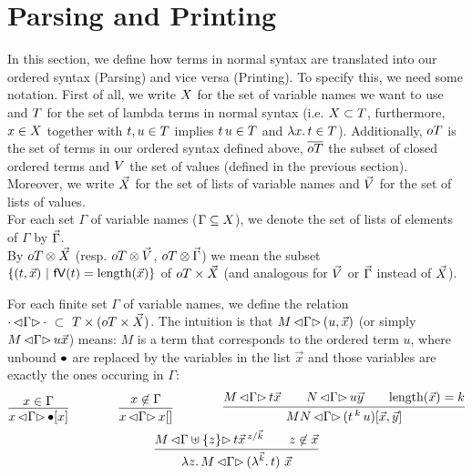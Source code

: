 \documentclass[submission,copyright,creativecommons]{eptcs}
\begin{document}
\section{Parsing and Printing}

In this section, we define how terms in normal syntax are translated into our ordered syntax (Parsing) and vice versa (Printing). 
To specify this, we need some notation. 
First of all, we write $X$ for the set of variable names we want to use and $T$ for the set of lambda terms in normal syntax (i.e. $X \subset T$, furthermore, $x \in X$ together with $t, u \in T$ implies $t \, u \in T$ and $\lambda {x}. \, t \in T$). Additionally, $oT$ is the set of terms in our ordered syntax defined above, $\overline{oT}$ the subset of closed ordered terms and $V$ the set of values (defined in the previous section).
Moreover, we write $\vec {X}$ for the set of lists of variable names and $\vec {V}$ for the set of lists of values. 
\\
For each set $\Gamma$ of variable names ($\Gamma \subseteq X$), we denote the set of lists of elements of $\Gamma$ by $\vec \Gamma$. 
\\
By $oT \otimes \vec {X}$ (resp. $oT \otimes \vec {V}$, $oT \otimes \vec \Gamma$) we mean the subset $\{(t, \vec x) \ | \ \mathsf{fV}(t) = \mbox{length}(\vec x) \}$ of $oT \times \vec {X}$ (and analogous for $\vec {V}$ or $\vec \Gamma$ instead of $\vec {X}$).
\\
\begin{defin}
For each finite %
set $\Gamma$ of variable names, we define the relation
$\cdot \, { \mathord{\lhd} {\Gamma} \mathord{\rhd} } \, \cdot \ \subset \  T \times (oT \times \vec {X})$.
The intuition is that $M \, { \mathord{\lhd} {\Gamma} \mathord{\rhd} } \, (u, \vec x)$ (or simply $M \, { \mathord{\lhd} {\Gamma} \mathord{\rhd} } \, u \vec x$) means: $M$ is a term that corresponds to the ordered term $u$, where unbound $\mathord{\bullet}$ are replaced by the variables in the list $\vec x$ and those variables are exactly the ones occuring in $\Gamma$:
\begin{gather*}
\infru{x \in \Gamma}{\parse x \Gamma {\ovar \ve x}}
\qquad
\qquad
\infru{x \not\in \Gamma}{\parse x \Gamma {x \emptyVec}}
\qquad
\qquad
\infru{ {\parse M \Gamma {t \vec x}} \qquad {\parse N \Gamma {u \vec y}} \qquad {\length{\vec x} = k} } {\parse {MN} {\Gamma} {(\ApO t k u) [\vec x, \vec y]} } \\
\infru{ 
         {\parse M { \Gamma \uplus \{z\} } {       t \multiinsert{\vec x}{\vec k}{z}   }} 
          \qquad 
          z \not\in \vec x  }
          {\parse {\LaA z M} {\Gamma} {(\LaO {\vec{k}} t) \ \vec x}}
\end{gather*}
\end{defin}
\end{document}
